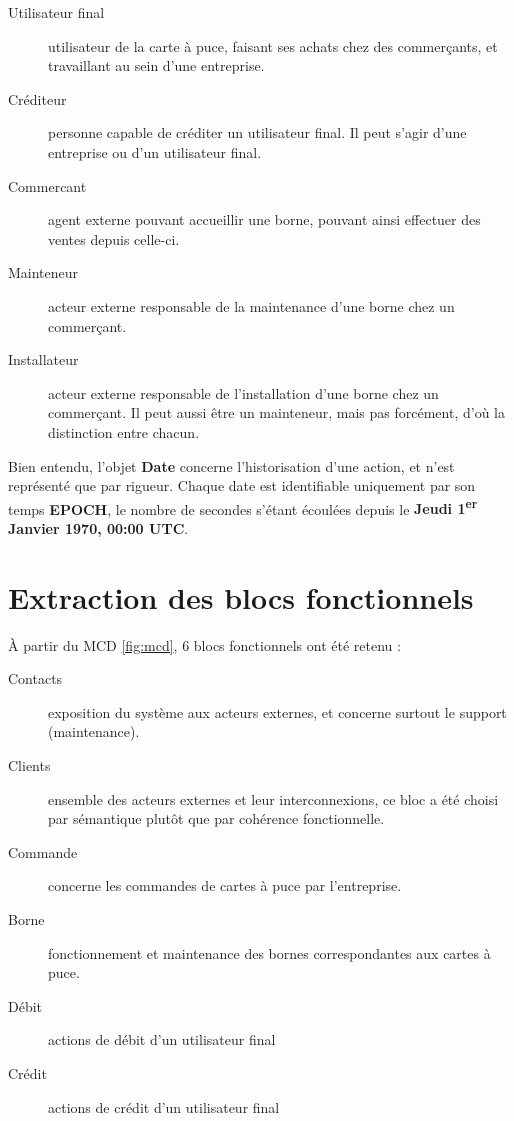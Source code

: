 \begin{description}
\begin{itemize}
    \end{itemize}
  \item[Utilisateur final] utilisateur de la carte à puce, faisant ses achats
    chez des commerçants, et travaillant au sein d'une entreprise.
  \item[Créditeur] personne capable de créditer un utilisateur final. Il peut
    s'agir d'une entreprise ou d'un utilisateur final.
  \item[Commercant] agent externe pouvant accueillir une borne, pouvant ainsi
    effectuer des ventes depuis celle-ci.
  \item[Mainteneur] acteur externe responsable de la maintenance d'une borne
    chez un commerçant.
  \item[Installateur] acteur externe responsable de l'installation d'une borne
    chez un commerçant. Il peut aussi être un mainteneur, mais pas forcément,
    d'où la distinction entre chacun.
\end{description}

Bien entendu, l'objet \textbf{Date} concerne l'historisation d'une action, et
n'est représenté que par rigueur. Chaque date est identifiable uniquement par
son temps \textbf{EPOCH}, le nombre de secondes s'étant écoulées depuis le
\textbf{Jeudi 1\textsuperscript{er} Janvier 1970, 00:00 UTC}.

\section{Extraction des blocs fonctionnels}

À partir du MCD \ref{fig:mcd}, 6 blocs fonctionnels ont été retenu :

\begin{description}
  \item[Contacts] exposition du système aux acteurs externes, et concerne
    surtout le support (maintenance).
  \item[Clients] ensemble des acteurs externes et leur interconnexions, ce bloc
    a été choisi par sémantique plutôt que par cohérence fonctionnelle.
  \item[Commande] concerne les commandes de cartes à puce par l'entreprise.
  \item[Borne] fonctionnement et maintenance des bornes correspondantes aux
    cartes à puce.
  \item[Débit] actions de débit d'un utilisateur final
  \item[Crédit] actions de crédit d'un utilisateur final
\end{description}

